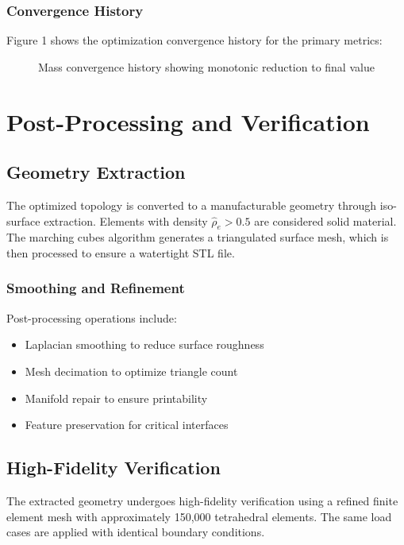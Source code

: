 \documentclass[11pt]{report}
\begin{document}
\subsection{Convergence History}
Figure 1 shows the optimization convergence history for the primary metrics:
\begin{figure}[h]
\centering
{}
\caption{Mass convergence history showing monotonic reduction to final value}
\end{figure}

\chapter{Post-Processing and Verification}

\section{Geometry Extraction}
The optimized topology is converted to a manufacturable geometry through iso-surface extraction. Elements with density $\hat{\rho}_e > 0.5$ are considered solid material. The marching cubes algorithm generates a triangulated surface mesh, which is then processed to ensure a watertight STL file.

\subsection{Smoothing and Refinement}
Post-processing operations include:
\begin{itemize}
    \item Laplacian smoothing to reduce surface roughness
    \item Mesh decimation to optimize triangle count
    \item Manifold repair to ensure printability
    \item Feature preservation for critical interfaces
\end{itemize}

\section{High-Fidelity Verification}
The extracted geometry undergoes high-fidelity verification using a refined finite element mesh with approximately 150,000 tetrahedral elements. The same load cases are applied with identical boundary conditions.
\end{document}
